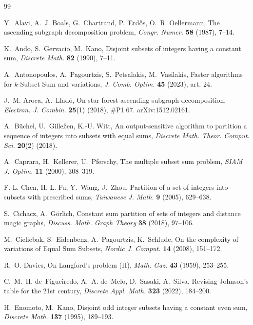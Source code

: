 \documentclass[11pt]{article}
\theoremstyle{definition}
\theoremstyle{remark}
\begin{document}
\begin{thebibliography}{99}

Y.~Alavi, A.~J. Boals, G.~Chartrand, P.~Erd\H{o}s, O.~R. Oellermann,
The ascending subgraph decomposition problem,
\emph{Congr. Numer.} \textbf{58} (1987), 7--14.

K.~Ando, S.~Gervacio, M.~Kano,
Disjoint subsets of integers having a constant sum,
\emph{Discrete Math.} \textbf{82} (1990), 7--11.

A.~Antonopoulos, A.~Pagourtzis, S.~Petsalakis, M.~Vasilakis,
Faster algorithms for $k$-Subset Sum and variations,
\emph{J. Comb. Optim.} \textbf{45} (2023), art. 24.

J.~M. Aroca, A.~Lladó,
On star forest ascending subgraph decomposition,
\emph{Electron. J. Combin.} \textbf{25}(1) (2018), \#P1.67. arXiv:1512.02161.

A.~Büchel, U.~Gilleßen, K.-U. Witt,
An output-sensitive algorithm to partition a sequence of integers into subsets with
equal sums,
\emph{Discrete Math. Theor. Comput. Sci.} \textbf{20}(2) (2018).

A.~Caprara, H.~Kellerer, U.~Pferschy,
The multiple subset sum problem,
\emph{SIAM J. Optim.} \textbf{11} (2000), 308--319.

F.-L. Chen, H.-L. Fu, Y.~Wang, J.~Zhou,
Partition of a set of integers into subsets with prescribed sums,
\emph{Taiwanese J. Math.} \textbf{9} (2005), 629--638.

S.~Cichacz, A.~Görlich,
Constant sum partition of sets of integers and distance magic graphs,
\emph{Discuss. Math. Graph Theory} \textbf{38} (2018), 97--106.

M.~Cieliebak, S.~Eidenbenz, A.~Pagourtzis, K.~Schlude,
On the complexity of variations of Equal Sum Subsets,
\emph{Nordic J. Comput.} \textbf{14} (2008), 151--172.

R.~O. Davies,
On Langford's problem (II),
\emph{Math. Gaz.} \textbf{43} (1959), 253--255.

C.~M.~H. de~Figueiredo, A.~A. de~Melo, D.~Sasaki, A.~Silva,
Revising Johnson's table for the 21st century,
\emph{Discrete Appl. Math.} \textbf{323} (2022), 184--200.

H.~Enomoto, M.~Kano,
Disjoint odd integer subsets having a constant even sum,
\emph{Discrete Math.} \textbf{137} (1995), 189--193.


\end{thebibliography}
\end{document}
